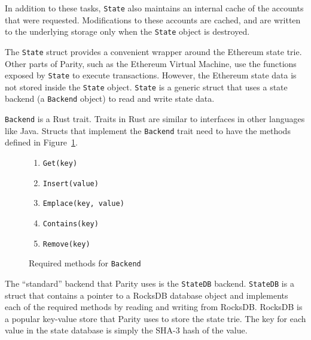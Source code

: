 \documentclass[12pt]{article}
\begin{document}
In addition to these tasks, \texttt{State} also maintains an internal cache of the accounts that were requested. Modifications to these accounts are cached, and are written to the underlying storage only when the \texttt{State} object is destroyed.

The \texttt{State} struct provides a convenient wrapper around the Ethereum state trie. Other parts of Parity, such as the Ethereum Virtual Machine, use the functions exposed by \texttt{State} to execute transactions. However, the Ethereum state data is not stored inside the \texttt{State} object. \texttt{State} is a generic struct that uses a state backend (a \texttt{Backend} object) to read and write state data.

\texttt{Backend} is a Rust trait. Traits in Rust are similar to interfaces in other languages like Java. Structs that implement the \texttt{Backend} trait need to have the methods defined in Figure~\ref{fig:backendmethods}.

\begin{figure}[H]
  \centering
  \begin{enumerate}
    \item \texttt{Get(key)}
    \item \texttt{Insert(value)}
    \item \texttt{Emplace(key, value)}
    \item \texttt{Contains(key)}
    \item \texttt{Remove(key)}
  \end{enumerate}
  \caption{Required methods for \texttt{Backend}}
  \label{fig:backendmethods}
\end{figure}


The ``standard'' backend that Parity uses is the \texttt{StateDB} backend. \texttt{StateDB} is a struct that contains a pointer to a RocksDB database object and implements each of the required methods by reading and writing from RocksDB. RocksDB is a popular key-value store that Parity uses to store the state trie. The key for each value in the state database is simply the SHA-3 hash of the value.
\end{document}
